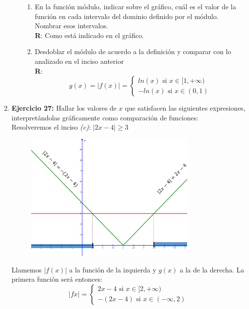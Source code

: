 \documentclass[12pt]{article}
\theoremstyle{definition}
\begin{document}
\begin{enumerate}
\begin{itemize}
\begin{enumerate}
\item En la función módulo, indicar sobre el gráfico, cuál es el valor de la función en cada intervalo del dominio definido por el módulo. Nombrar esos intervalos.\\
\textbf{R}:  Como está indicado en el gráfico.
\item Desdoblar el módulo de acuerdo a la definición y comparar con lo analizado en el inciso anterior\\
\textbf{R}: 
\begin{equation*}
         g(x) = | f(x) | = \left \{
	\begin{aligned}
	ln (x)  \text{   si }  x \in  [1,+ \infty)\\
	-ln (x) \text{ si } x \in  (0,1)
	\end{aligned}
	\right.
\end{equation*}
\end{enumerate}
\end{itemize}

\item  \textbf{Ejercicio 27:}  Hallar los valores de $x$ que satisfacen las siguientes expresiones, interpretándolas gráficamente como comparación de funciones:\\
Resolveremos el inciso \textit{(c)}: $|2x-4| \geq 3$ 
\begin{figure}[H]
\centering
\includegraphics[width=0.8\textwidth]{27.png}
\end{figure}
Llamemos $|f(x)|$ a la función de la izquierda y $g(x)$ a la de la derecha. La primera función será entonces:
\begin{equation*}
         | fx | = \left \{
	\begin{aligned}
	2x-4  \text{   si }  x \in  [2,+ \infty)\\
	-(2x-4) \text{ si } x \in  (-\infty, 2)
	\end{aligned}
	\right.
\end{equation*}


\end{enumerate}
\end{document}
